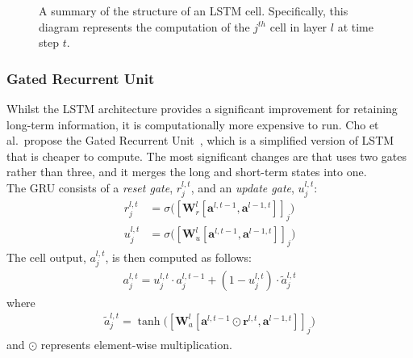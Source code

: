 \documentclass[a4paper, 12pt]{report}
\newcommand{\tit}[1]{\textit{#1}}
\begin{document}
\begin{figure}[h]
\caption{A summary of the structure of an LSTM cell. Specifically, this diagram represents the computation of the $j^{th}$ cell in layer $l$ at time step $t$.}
\label{fig:lstm_structure}
\end{figure}

\subsubsection{Gated Recurrent Unit}
Whilst the LSTM architecture provides a significant improvement for retaining long-term information, it is computationally more expensive to run. Cho et al.\ propose the Gated Recurrent Unit~\cite{gru:cho2014}, which is a simplified version of LSTM that is cheaper to compute. The most significant changes are that uses two gates rather than three, and it merges the long and short-term states into one. \\

The GRU consists of a \tit{reset gate}, $r_j^{l, t}$, and an \tit{update gate}, $u_j^{l, t}$:
\begin{align}
	r_j^{l, t} &= \sigma \big( [\mathbf{W}_r^l [\mathbf{a}^{l, t - 1}, \mathbf{a}^{l - 1, t}]]_j \big) \\
	u_j^{l, t} &= \sigma \big( [\mathbf{W}_u^l [\mathbf{a}^{l, t - 1}, \mathbf{a}^{l - 1, t}]]_j \big)
\end{align}
The cell output, $a_j^{l, t}$, is then computed as follows:
\begin{gather}
	a_j^{l, t} = u_j^{l, t} \cdot a_j^{l, t - 1} + (1 - u_j^{l, t}) \cdot \tilde{a}_j^{l, t}
\end{gather}
where
\begin{gather}
	\tilde{a}_j^{l, t} = \tanh \big( [\mathbf{W}_a^l [\mathbf{a}^{l, t - 1} \odot \mathbf{r}^{l, t}, \mathbf{a}^{l - 1, t}]]_j \big)
\end{gather}
and $\odot$ represents element-wise multiplication. \\
\end{document}

